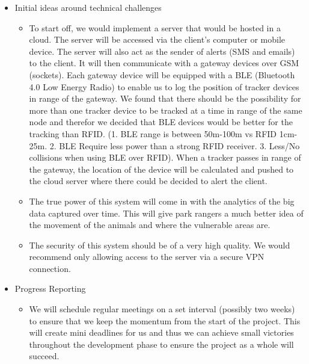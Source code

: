 
\begin{itemize}
	\item Initial ideas around technical challenges
	\begin{itemize}
		\item[] To start off, we would implement a server that would be hosted in a cloud. The server will be accessed via the client's computer or mobile device. The server will also act as the sender of alerts (SMS and emails) to the client. It will then communicate with a gateway devices over GSM (sockets). Each gateway device will be equipped with a BLE (Bluetooth 4.0 Low Energy Radio) to enable us to log the position of tracker devices in range of the gateway. We found that there should be the possibility for more than one tracker device to be tracked at a time in range of the same node and therefor we decided that BLE devices would be better for the tracking than RFID. (1. BLE range is between 50m-100m vs RFID 1cm-25m. 2. BLE Require less power than a strong RFID receiver. 3. Less/No collisions when using BLE over RFID). When a tracker passes in range of the gateway, the location of the device will be calculated and pushed to the cloud server where there could be decided to alert the client. 
		\item[] The true power of this system will come in with the analytics of the big data captured over time. This will give park rangers a much better idea of the movement of the animals and where the vulnerable areas are.
		\item[] The security of this system should be of a very high quality. We would recommend only allowing access to the server via a secure VPN connection.
	\end{itemize}
	
	\item Progress Reporting
	\begin{itemize}
		\item[] We will schedule regular meetings on a set interval (possibly two weeks) to ensure that we keep the momentum from the start of the project. This will create mini deadlines for us and thus we can achieve small victories throughout the development phase to ensure the project as a whole will succeed.
	\end{itemize}
	

\end{itemize}
